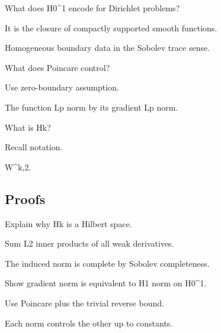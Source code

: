 \begin{exercise}\label{exr:iii21-expand-03}
What does H0\textasciicircum{}1 encode for Dirichlet problems?
\end{exercise}
\begin{hint}
It is the closure of compactly supported smooth functions.
\end{hint}
\begin{solution}
Homogeneous boundary data in the Sobolev trace sense.
\end{solution}

\begin{exercise}[Poincare]\label{exr:iii21-expand-04}
What does Poincare control?
\end{exercise}
\begin{hint}
Use zero-boundary assumption.
\end{hint}
\begin{solution}
The function Lp norm by its gradient Lp norm.
\end{solution}

\begin{exercise}[Hk]\label{exr:iii21-expand-05}
What is Hk?
\end{exercise}
\begin{hint}
Recall notation.
\end{hint}
\begin{solution}
W\textasciicircum{}{k,2}.
\end{solution}

\subsection*{Proofs}

\begin{exercise}\label{exr:iii21-expand-06}
Explain why Hk is a Hilbert space.
\end{exercise}
\begin{hint}
Sum L2 inner products of all weak derivatives.
\end{hint}
\begin{solution}
The induced norm is complete by Sobolev completeness.
\end{solution}

\begin{exercise}\label{exr:iii21-expand-07}
Show gradient norm is equivalent to H1 norm on H0\textasciicircum{}1.
\end{exercise}
\begin{hint}
Use Poincare plus the trivial reverse bound.
\end{hint}
\begin{solution}
Each norm controls the other up to constants.
\end{solution}

